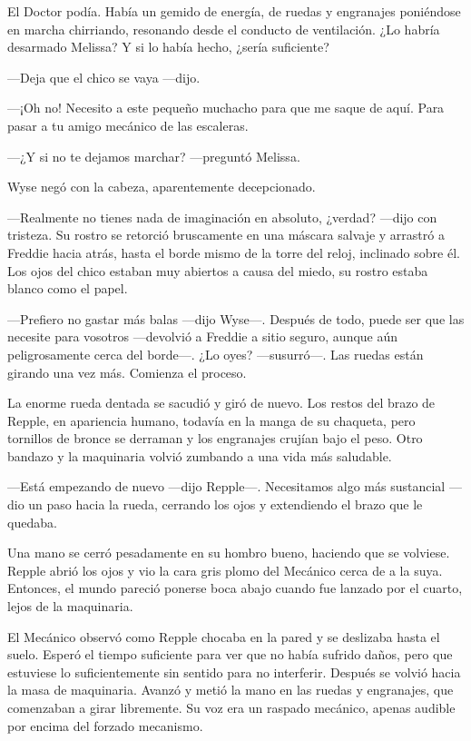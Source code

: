 {El Doctor podía. Había un gemido de energía, de ruedas y engranajes
	poniéndose en marcha chirriando, resonando desde el conducto de
	ventilación. ¿Lo habría desarmado Melissa? Y si lo había hecho, ¿sería
suficiente?}

{---Deja que el chico se vaya ---dijo.}

{---¡Oh no! Necesito a este pequeño muchacho para que me saque de aquí.
Para pasar a tu amigo mecánico de las escaleras.}

{---¿Y si no te dejamos marchar? ---preguntó Melissa.}

{Wyse negó con la cabeza, aparentemente decepcionado.}

{---Realmente no tienes nada de imaginación en absoluto, ¿verdad?
	---dijo con tristeza. Su rostro se retorció bruscamente en una máscara
	salvaje y arrastró a Freddie hacia atrás, hasta el borde mismo de la
	torre del reloj, inclinado sobre él. Los ojos del chico estaban muy
abiertos a causa del miedo, su rostro estaba blanco como el papel.}

{---Prefiero no gastar más balas ---dijo Wyse---. Después de todo, puede
	ser que las necesite para vosotros ---devolvió a Freddie a sitio seguro,
	aunque aún peligrosamente cerca del borde---. ¿Lo oyes? ---susurró---.
Las ruedas están girando una vez más. Comienza el proceso.}

{La enorme rueda dentada se sacudió y giró de nuevo. Los restos del
	brazo de Repple, en apariencia humano, todavía en la manga de su
	chaqueta, pero tornillos de bronce se derraman y los engranajes crujían
	bajo el peso. Otro bandazo y la maquinaria volvió zumbando a una vida
más saludable.}

{---Está empezando de nuevo ---dijo Repple---. Necesitamos algo más
	sustancial ---dio un paso hacia la rueda, cerrando los ojos y
extendiendo el brazo que le quedaba.}

{Una mano se cerró pesadamente en su hombro bueno, haciendo que se
	volviese. Repple abrió los ojos y vio la cara gris plomo del Mecánico
	cerca de a la suya. Entonces, el mundo pareció ponerse boca abajo cuando
fue lanzado por el cuarto, lejos de la maquinaria.}

{El Mecánico observó como Repple chocaba en la pared y se deslizaba
	hasta el suelo. Esperó el tiempo suficiente para ver que no había
	sufrido daños, pero que estuviese lo suficientemente sin sentido para no
	interferir. Después se volvió hacia la masa de maquinaria. Avanzó y
	metió la mano en las ruedas y engranajes, que comenzaban a girar
	libremente. Su voz era un raspado mecánico, apenas audible por encima
del forzado mecanismo.}

